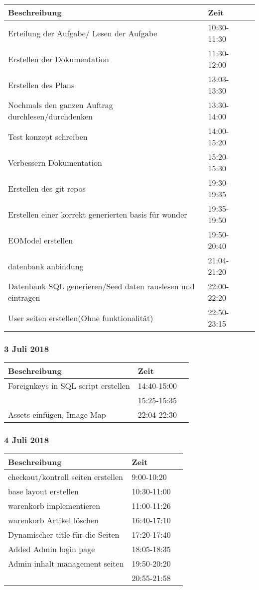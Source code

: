 \documentclass[a4paper, 11pt]{article}
\begin{document}
\begin{tabular}{llr}
\toprule
Beschreibung & Zeit \\
\midrule
Erteilung der Aufgabe/ Lesen der Aufgabe & 10:30-11:30 \\
Erstellen der Dokumentation & 11:30-12:00 \\
Erstellen des Plans & 13:03-13:30 \\
Nochmals den ganzen Auftrag durchlesen/durchdenken & 13:30-14:00 \\
Test konzept schreiben & 14:00-15:20 \\
Verbessern Dokumentation & 15:20-15:30 \\
Erstellen des git repos & 19:30-19:35 \\
Erstellen einer korrekt generierten basis  für wonder & 19:35-19:50 \\
EOModel erstellen & 19:50-20:40 \\
datenbank anbindung & 21:04-21:20 \\
Datenbank SQL generieren/Seed daten rauslesen und eintragen & 22:00-22:20 \\
User seiten erstellen(Ohne funktionalität) & 22:50-23:15 \\
\bottomrule
\end{tabular}

\subsubsection{3 Juli 2018}

\begin{tabular}{llr}
\toprule
Beschreibung & Zeit \\
\midrule
Foreignkeys in SQL script erstellen & 14:40-15:00 \\
 & 15:25-15:35 \\
Assets einfügen, Image Map & 22:04-22:30 \\
\bottomrule
\end{tabular}

\subsubsection{4 Juli 2018}

\begin{tabular}{llr}
\toprule
Beschreibung & Zeit \\
\midrule
checkout/kontroll seiten erstellen & 9:00-10:20 \\
base layout erstellen & 10:30-11:00 \\
warenkorb implementieren & 11:00-11:26 \\
warenkorb Artikel löschen & 16:40-17:10 \\
Dynamischer title für die Seiten & 17:20-17:40 \\
Added Admin login page & 18:05-18:35 \\
Admin inhalt management seiten & 19:50-20:20 \\
 & 20:55-21:58 \\
\bottomrule
\end{tabular}
\end{document}
